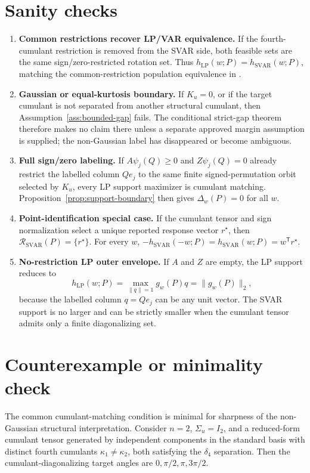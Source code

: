 \documentclass[11pt]{article}
\newcommand{\transpose}{\mathsf{T}}
\theoremstyle{definition}
\theoremstyle{plain}
\theoremstyle{remark}
\begin{document}
\section{Sanity checks}
\begin{enumerate}[leftmargin=*]
\item \textbf{Common restrictions recover LP/VAR equivalence.}  If the
fourth-cumulant restriction is removed from the SVAR side, both feasible sets
are the same sign/zero-restricted rotation set.  Thus
\(h_{\mathrm{LP}}(w;P)=h_{\mathrm{SVAR}}(w;P)\), matching the common-restriction
population equivalence in \cite{PlagborgMollerWolf2021}.

\item \textbf{Gaussian or equal-kurtosis boundary.}  If \(K_u=0\), or if the
target cumulant is not separated from another structural cumulant, then
Assumption~\ref{ass:bounded-gap} fails.  The conditional strict-gap theorem
therefore makes no claim there unless a separate approved margin assumption is
supplied; the non-Gaussian label has disappeared or become ambiguous.

\item \textbf{Full sign/zero labeling.}  If \(A\psi_j(Q)\ge0\) and
\(Z\psi_j(Q)=0\) already restrict the labelled column \(Qe_j\) to the same
finite signed-permutation orbit selected by \(K_u\), every LP support maximizer
is cumulant matching.  Proposition~\ref{prop:support-boundary} then gives
\(\Delta_w(P)=0\) for all \(w\).

\item \textbf{Point-identification special case.}  If the cumulant tensor and
sign normalization select a unique reported response vector \(r^\star\), then
\(\mathcal R_{\mathrm{SVAR}}(P)=\{r^\star\}\).  For every \(w\),
\(-h_{\mathrm{SVAR}}(-w;P)=h_{\mathrm{SVAR}}(w;P)=w^\transpose r^\star\).

\item \textbf{No-restriction LP outer envelope.}  If \(A\) and \(Z\) are empty,
the LP support reduces to
\[
h_{\mathrm{LP}}(w;P)=\max_{\|q\|=1} g_w(P)q=\|g_w(P)\|_2,
\]
because the labelled column \(q=Qe_j\) can be any unit vector.  The SVAR
support is no larger and can be strictly smaller when the cumulant tensor
admits only a finite diagonalizing set.
\end{enumerate}

\section{Counterexample or minimality check}
The common cumulant-matching condition is minimal for sharpness of the
non-Gaussian structural interpretation.  Consider \(n=2\), \(\Sigma_u=I_2\),
and a reduced-form cumulant tensor generated by independent components in the
standard basis with distinct fourth cumulants
\(\kappa_1\ne\kappa_2\), both satisfying the \(\delta_4\) separation.  Then the
cumulant-diagonalizing target angles are \(0,\pi/2,\pi,3\pi/2\).
\end{document}
